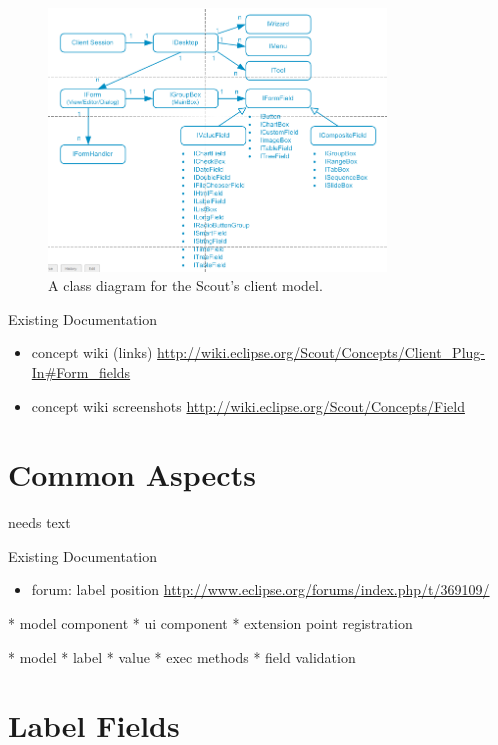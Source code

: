 \documentclass[a4paper,10pt,twoside]{book}
\begin{document}
\begin{figure}[!htb]
\centering
\includegraphics[width=0.8\textwidth]{scoutclientmodel.png}
\caption{A class diagram for the Scout's client model.}
\label{fig:scoutclientmodel}
\end{figure}



\noindent Existing Documentation
\begin{itemize}
  \item concept wiki (links) \url{http://wiki.eclipse.org/Scout/Concepts/Client_Plug-In#Form_fields}
  \item concept wiki screenshots \url{http://wiki.eclipse.org/Scout/Concepts/Field}
\end{itemize}

\section{Common Aspects}
needs text

\noindent Existing Documentation
\begin{itemize}
  \item forum: label position \url{http://www.eclipse.org/forums/index.php/t/369109/}
\end{itemize}

* model component
* ui component
* extension point registration

* model
* label
* value
* exec methods
* field validation


\section{Label Fields}
\end{document}
